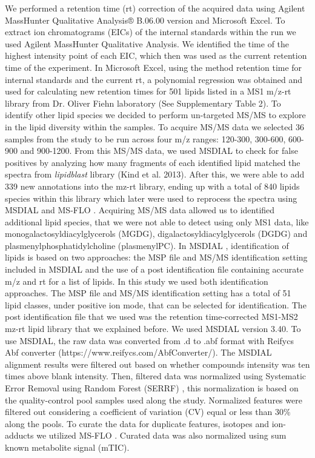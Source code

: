 \documentclass[9pt,twocolumn,twoside,lineno]{gsajnl}
\begin{document}
We performed a retention time (rt) correction of the acquired data using Agilent MassHunter Qualitative Analysis® B.06.00 version and Microsoft Excel. 
To extract ion chromatograms (EICs) of the internal standards within the run we used Agilent MassHunter Qualitative Analysis.
We identified the time of the highest intensity point of each EIC, which then was used as the current retention time of the experiment. 
In Microsoft Excel, using the method retention time for internal standards and the current rt, a polynomial regression was obtained and used for calculating new retention times for 501 lipids listed in a MS1 m/z-rt library from Dr. Oliver Fiehn laboratory (See Supplementary Table 2). 
To identify other lipid species we decided to perform un-targeted MS/MS to explore in the lipid diversity within the samples. 
To acquire MS/MS data we selected 36 samples from the study to be run across four m/z ranges: 120-300, 300-600, 600-900 and 900-1200. 
From this MS/MS data, we used MSDIAL \cite{Tsugawa2015-kh} to check for false positives by analyzing how many fragments of each identified lipid matched the spectra from \textit{lipidblast} library (Kind et al. 2013). 
After this, we were able to add 339 new annotations into the mz-rt library, ending up with a total of 840 lipids species within this library which later were used to reprocess the spectra using MSDIAL and MS-FLO \cite{DeFelice}. 
Acquiring MS/MS data allowed us to identified additional lipid species, that we were not able to detect using only MS1 data, like monogalactosyldiacylglycerols (MGDG), digalactosyldiacylglycerols (DGDG) and plasmenylphosphatidylcholine (plasmenylPC). 
In MSDIAL \cite{Tsugawa2015-kh}, identification of lipids is based on two approaches: the MSP file and MS/MS identification setting included in MSDIAL and the use of a post identification file containing accurate m/z and rt for a list of lipids. In this study we used both identification approaches. 
The MSP file and MS/MS identification setting has a total of 51 lipid classes, under positive ion mode, that can be selected for identification. 
The post identification file that we used was the retention time-corrected MS1-MS2 mz-rt lipid library that we explained before. 
We used MSDIAL \cite{Tsugawa2015-kh} version 3.40. To use MSDIAL, the raw data was converted from .d to .abf format with Reifycs Abf converter (https://www.reifycs.com/AbfConverter/). 
The MSDIAL alignment results were filtered out based on whether compounds intensity was ten times above blank intensity. 
Then, filtered data was normalized using Systematic Error Removal using Random Forest (SERRF) \cite{Fan2019}, this normalization is based on the quality-control pool samples used along the study. Normalized features were filtered out considering a coefficient of variation (CV) equal or less than 30\% along the pools. 
To curate the data for duplicate features, isotopes and ion-adducts we utilized MS-FLO \cite{DeFelice}.
Curated data was also normalized using sum known metabolite signal (mTIC).
\end{document}
